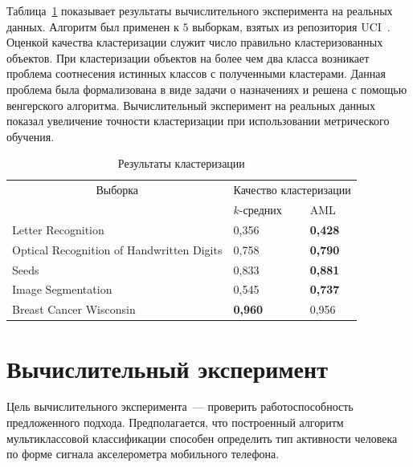 Таблица~\ref{ch4:tbl:clusteing_results} показывает результаты вычислительного эксперимента на реальных
данных.
Алгоритм был применен к $5$ выборкам, взятых из репозитория UCI~\cite{uci2017}.
Оценкой качества кластеризации служит число правильно кластеризованных объектов.
При клас\-те\-ри\-за\-ции объектов на более чем два класса возникает проблема соотнесения истинных классов с полученными кластерами.
Данная проблема была формализована в виде задачи о назначениях и решена с помощью венгерского алгоритма. Вычислительный эксперимент на реальных данных показал увеличение точности кластеризации при использовании метрического обучения.
\begin{table} %
\centering
\caption{Результаты кластеризации}
\label{ch4:tbl:clusteing_results}

\vspace{2ex}

\begin{tabular}{|l|l|l|}
\hline
\multicolumn{1}{|c}{Выборка}                  & \multicolumn{2}{c|}{Качество кластеризации} \\ \cline{2-3}
                                          & $k$-средних               & AML                 \\
\hline
Letter Recognition                        & 0,356                 & \textbf{0,428}             \\
Optical Recognition of Handwritten Digits & 0,758                 & \textbf{0,790}               \\
Seeds                                     & 0,833                 & \textbf{0,881}            \\
Image Segmentation                        & 0,545                 & \textbf{0,737}            \\
Breast Cancer Wisconsin                   & \textbf{0,960}                 & 0,956               \\ \hline
\end{tabular}
\end{table}



	\section{Вычислительный эксперимент}
	Цель вычислительного эксперимента~--- проверить работоспособность предложенного подхода.
	Предполагается, что построенный алгоритм мультиклассовой классификации способен определить тип активности человека по форме сигнала акселерометра мобильного телефона.
	
